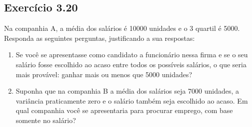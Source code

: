 \documentclass[
]{latex/krantz}
\providecommand{\tightlist}{%
  \setlength{\itemsep}{0pt}\setlength{\parskip}{0pt}}
\theoremstyle{definition}
\theoremstyle{definition}
\theoremstyle{definition}
\theoremstyle{definition}
\theoremstyle{remark}
\begin{document}
\hypertarget{exr3-20}{%
\subsection*{Exercício 3.20}\label{exr3-20}}

Na companhia A, a média dos salários é 10000 unidades e o 3 quartil é 5000. Responda as seguintes perguntas, justificando a sua respostas:

\begin{enumerate}
\def\labelenumi{\alph{enumi})}
\tightlist
\item
  Se você se apresentasse como candidato a funcionário nessa firma e se o seu salário fosse escolhido ao acaso entre todos os possíveis salários, o que seria mais provável: ganhar mais ou menos que 5000 unidades?
\item
  Suponha que na companhia B a média dos salários seja 7000 unidades, a variância praticamente zero e o salário também seja escolhido ao acaso. Em qual companhia você se apresentaria para procurar emprego, com base somente no salário?
\end{enumerate}
\end{document}
